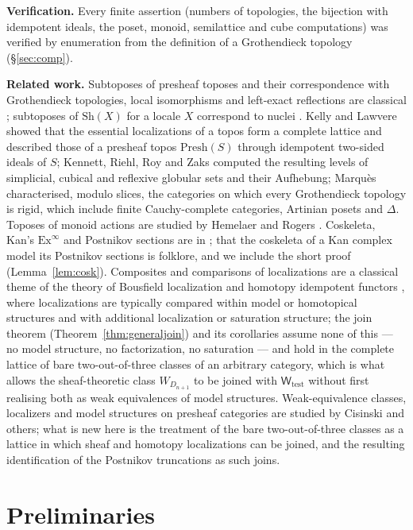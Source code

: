 \documentclass[11pt]{amsart}
\theoremstyle{definition}
\newcommand{\Presh}{\mathrm{Presh}}
\newcommand{\Sh}{\mathrm{Sh}}
\newcommand{\Wtest}{\mathsf{W}_{\mathrm{test}}}
\begin{document}
\medskip\noindent\textbf{Verification.} Every finite assertion (numbers of
topologies, the bijection with idempotent ideals, the poset, monoid,
semilattice and cube computations) was verified by enumeration from the
definition of a Grothendieck topology (\S\ref{sec:comp}).

\medskip\noindent\textbf{Related work.} Subtoposes of presheaf toposes and
their correspondence with Grothendieck topologies, local isomorphisms and
left-exact reflections are classical \cite{MLM,Elephant}; subtoposes of
$\Sh(X)$ for a locale $X$ correspond to nuclei \cite{Stone}. Kelly and
Lawvere \cite{KL89} showed that the essential localizations of a topos form a
complete lattice and described those of a presheaf topos $\Presh(S)$ through
idempotent two-sided ideals of $S$; Kennett, Riehl, Roy and Zaks \cite{KRRZ}
computed the resulting levels of simplicial, cubical and reflexive globular
sets and their Aufhebung; Marqu\`es \cite{Marques25} characterised, modulo
slices, the categories on which every Grothendieck topology is rigid, which
include finite Cauchy-complete categories, Artinian posets \cite{Lin14} and
$\Delta$. Toposes of monoid actions are studied by Hemelaer and Rogers
\cite{HR,Rogers}. Coskeleta, Kan's $\mathrm{Ex}^\infty$ and Postnikov sections
are in \cite{GJ}; that the coskeleta of a Kan complex model its Postnikov
sections is folklore, and we include the short proof
(Lemma~\ref{lem:cosk}). Composites and comparisons of localizations are a
classical theme of the theory of Bousfield localization and homotopy
idempotent functors \cite{Bousfield,Hirschhorn}, where localizations are
typically compared within model or homotopical structures and with
additional localization or saturation structure; the join theorem (Theorem~\ref{thm:generaljoin}) and
its corollaries assume none of this --- no model structure, no factorization,
no saturation --- and hold in the complete lattice of bare two-out-of-three
classes of an arbitrary category, which is what allows the sheaf-theoretic
class $W_{D_{n+1}}$ to be joined with $\Wtest$ without first realising both
as weak equivalences of model structures. Weak-equivalence
classes, localizers and model structures on presheaf categories are studied
by Cisinski and others; what is new here is the treatment of the bare
two-out-of-three classes as a lattice in which sheaf and homotopy
localizations can be joined, and the resulting identification of the
Postnikov truncations as such joins.

\section{Preliminaries}\label{sec:prelim}
\end{document}
